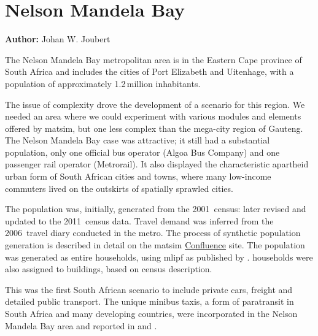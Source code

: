 \section{Nelson Mandela Bay}
\label{sec:nelsonMandelaBay}
\hfill \textbf{Author:} Johan W. Joubert

The Nelson Mandela Bay metropolitan area is in the Eastern Cape province of South Africa and includes the cities of Port Elizabeth and Uitenhage, with a population of approximately 1.2\,million inhabitants.

The issue of complexity drove the development of a scenario for this region. We needed an area where we could experiment with various modules and elements offered by \gls{matsim}, but one less complex than the mega-city region of Gauteng. The Nelson Mandela Bay case was attractive; it still had a substantial population, only one official bus operator (Algoa Bus Company) and one passenger rail operator (Metrorail). It also displayed the characteristic apartheid urban form of South African cities and towns, where many low-income commuters lived on the outskirts of spatially sprawled cities.

The population was, initially, generated from the 2001~census: later revised and updated to the 2011~census data. Travel demand was inferred from the 2006~travel diary conducted in the metro. The process of synthetic population generation is described in detail on the \gls{matsim} \href{https://matsim.atlassian.net/wiki/display/MATPUB/South+Africa}{Confluence} site. The population was generated as entire households, using \gls{mlipf} as published by \citet[][]{MuellerKAxhausen_LATSIS_2012}. households were also assigned to buildings, based on census description.

This was the first South African scenario to include private cars, freight and detailed public transport. The unique minibus taxis, a form of paratransit in South Africa and many developing countries, were incorporated in the Nelson Mandela Bay area and reported in \citet[][]{Roeder2013MasterMinibus} and \citet[][]{NeumannEtAl2014MinibusRSA}.

